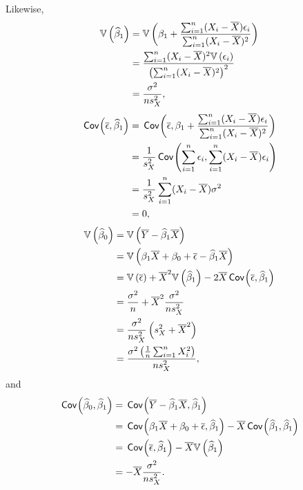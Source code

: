 \begin{ex}
  Likewise,
  \begin{align*}
    \var{\betahat_1}
     & =\var{\beta_1+\frac{\sum_{i=1}^n(X_i-\Xbar)\epsilon_i}{\sum_{i=1}^n(X_i-\Xbar)^2}}          \\
     & =\frac{\sum_{i=1}^n(X_i-\Xbar)^2\var{\epsilon_i}}{\left(\sum_{i=1}^n(X_i-\Xbar)^2\right)^2} \\
     & =\frac{\sigma^2}{ns_X^2},
  \end{align*}
  \begin{align*}
    \cov{\epsbar, \betahat_1}
     & =\cov{\epsbar, \beta_1+\frac{\sum_{i=1}^n(X_i-\Xbar)\epsilon_i}{\sum_{i=1}^n(X_i-\Xbar)^2}} \\
     & =\frac{1}{s_X^2}\cov{\sum_{i=1}^n\epsilon_i, \sum_{i=1}^n(X_i-\Xbar)\epsilon_i}             \\
     & =\frac{1}{s_X^2}\sum_{i=1}^n(X_i-\Xbar)\sigma^2                                             \\
     & =0,
  \end{align*}
  \begin{align*}
    \var{\betahat_0}
     & =\var{\Ybar-\betahat_1\Xbar}                                           \\
     & =\var{\beta_1\Xbar+\beta_0+\epsbar-\betahat_1\Xbar}                    \\
     & =\var{\epsbar}+\Xbar^2\var{\betahat_1}-2\Xbar\cov{\epsbar, \betahat_1} \\
     & =\frac{\sigma^2}{n}+\Xbar^2\frac{\sigma^2}{ns_X^2}                     \\
     & =\frac{\sigma^2}{ns_X^2}\left(s_X^2+\Xbar^2\right)                     \\
     & =\frac{\sigma^2\left(\frac{1}{n}\sum_{i=1}^nX_i^2\right)}{ns_X^2},
  \end{align*}
  and
  \begin{align*}
    \cov{\betahat_0, \betahat_1}
     & =\cov{\Ybar-\betahat_1\Xbar, \betahat_1}         \\
     & =\cov{\beta_1\Xbar+\beta_0+\epsbar, \betahat_1}
    -\Xbar\cov{\betahat_1, \betahat_1}                  \\
     & =\cov{\epsbar, \betahat_1}-\Xbar\var{\betahat_1} \\
     & =-\Xbar\frac{\sigma^2}{ns_X^2}.
  \end{align*}
\end{ex}

